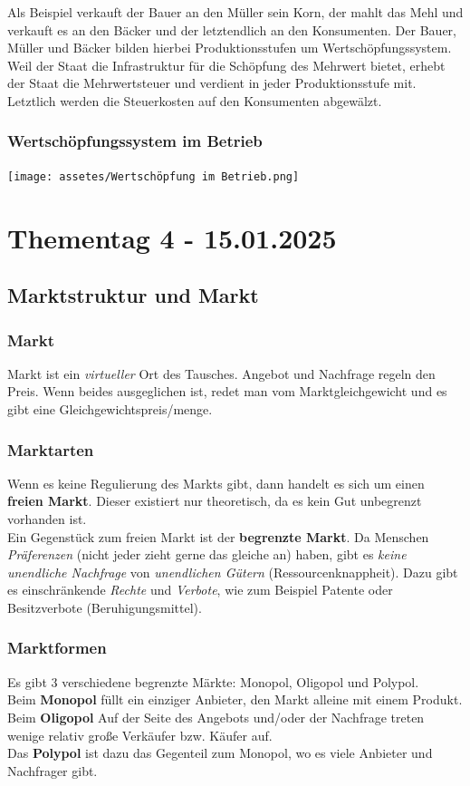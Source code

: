\documentclass[]{article}
\begin{document}
Als Beispiel verkauft der Bauer an den Müller sein Korn, der mahlt das Mehl und verkauft es an den Bäcker und der letztendlich an den Konsumenten. Der Bauer, Müller und Bäcker bilden hierbei Produktionsstufen um Wertschöpfungssystem.\\
Weil der Staat die Infrastruktur für die Schöpfung des Mehrwert bietet, erhebt der Staat die Mehrwertsteuer und verdient in jeder Produktionsstufe mit. Letztlich werden die Steuerkosten auf den Konsumenten abgewälzt.

\subsubsection{Wertschöpfungssystem im Betrieb}
\texttt{[image: assetes/Wertschöpfung im Betrieb.png]}


\newpage
\section{Thementag 4 - 15.01.2025}

\subsection{Marktstruktur und Markt}

\subsubsection{Markt}
Markt ist ein \textit{virtueller} Ort des Tausches. Angebot und Nachfrage regeln den Preis. Wenn beides ausgeglichen ist, redet man vom Marktgleichgewicht und es gibt eine Gleichgewichtspreis/menge. 
\subsubsection{Marktarten}
Wenn es keine Regulierung des Markts gibt, dann handelt es sich um einen \textbf{freien Markt}. Dieser existiert nur theoretisch, da es kein Gut unbegrenzt vorhanden ist.\\
Ein Gegenstück zum freien Markt ist der \textbf{begrenzte Markt}. Da Menschen \textit{Präferenzen} (nicht jeder zieht gerne das gleiche an) haben, gibt es \textit{keine unendliche Nachfrage} von \textit{unendlichen Gütern} (Ressourcenknappheit). Dazu gibt es einschränkende \textit{Rechte} und \textit{Verbote}, wie zum Beispiel Patente oder Besitzverbote (Beruhigungsmittel).
\subsubsection{Marktformen}
Es gibt 3 verschiedene begrenzte Märkte: Monopol, Oligopol und Polypol. \\
Beim \textbf{Monopol} füllt ein einziger Anbieter, den Markt alleine mit einem Produkt.\\
Beim \textbf{Oligopol} Auf der Seite des Angebots und/oder der Nachfrage treten wenige relativ große Verkäufer bzw. Käufer auf.\\
Das \textbf{Polypol} ist dazu das Gegenteil zum Monopol, wo es viele Anbieter und Nachfrager gibt.
\end{document}
